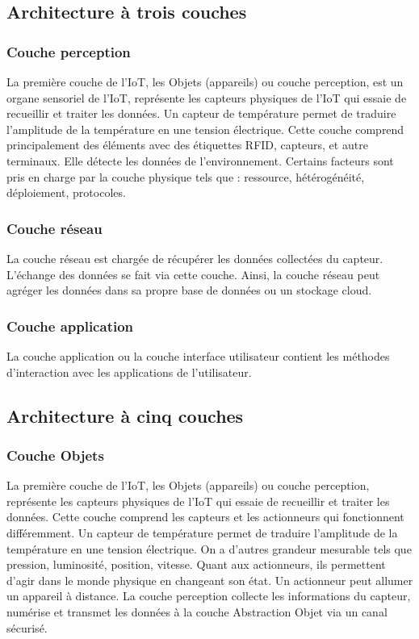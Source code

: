 	\subsection{Architecture à trois couches}
	\subsubsection{Couche perception }
La première couche de l’IoT, les Objets (appareils) ou couche perception, est un organe sensoriel de l’IoT, représente les capteurs physiques de l’IoT qui essaie de recueillir et traiter les données. Un capteur de température permet de traduire l’amplitude de la température en une tension électrique. Cette couche comprend principalement des éléments avec des étiquettes RFID, capteurs, et autre terminaux. Elle détecte les données de l’environnement. Certains facteurs sont pris en charge par la couche physique tels que : ressource, hétérogénéité, déploiement, protocoles.\\

	\subsubsection{Couche réseau}
La couche réseau est chargée de récupérer les données collectées du capteur. L’échange des données se fait via cette couche. Ainsi, la couche réseau peut agréger les données dans sa propre base de données ou un stockage cloud.\\

	\subsubsection{Couche application}
La couche application ou la couche interface utilisateur contient les méthodes d’interaction avec les applications de l’utilisateur.\\

	\subsection{Architecture à cinq couches}
	\subsubsection{Couche Objets}
La première couche de l’IoT, les Objets (appareils) ou couche perception, représente les capteurs physiques de l’IoT qui essaie de recueillir et traiter les données. Cette couche comprend les capteurs et les actionneurs qui fonctionnent dif{\kern0pt}féremment. Un capteur de température permet de traduire l’amplitude de la température en une tension électrique. On a d’autres grandeur mesurable tels que pression, luminosité, position, vitesse. Quant aux actionneurs, ils permettent d’agir dans le monde physique en changeant son état. Un actionneur peut allumer un appareil à distance. La couche perception collecte les informations du capteur, numérise et transmet les données à la couche Abstraction Objet via un canal sécurisé.\\

